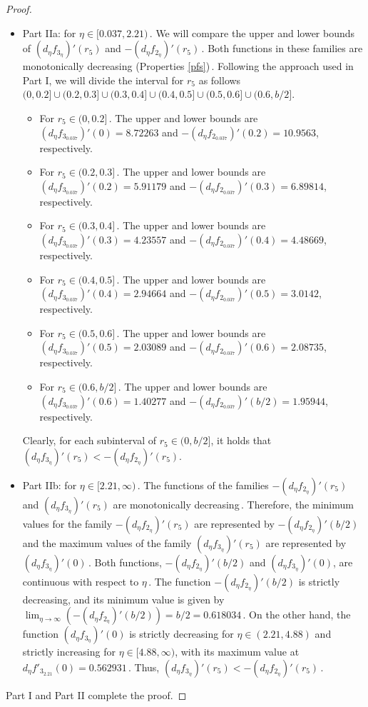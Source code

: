 \documentclass[final,11pt]{article}
\numberwithin{equation}{section}
\theoremstyle{definition}
\begin{document}
\begin{proof}
\begin{itemize}
\item Part IIa: for $\eta\in[0.037,2.21)$\,. We will compare the upper and lower bounds of $(d_{\eta}f_{3_{\eta}})'(r_{5})$ and $-(d_{\eta}f_{2_{\eta}})'(r_{5})$\,. Both functions in these families are monotonically decreasing (Properties \ref{pfs})\,. Following the approach used in Part I, we will divide the interval for $r_{5}$ as follows $(0,0.2]\cup(0.2,0.3]\cup(0.3,0.4]\cup(0.4,0.5]\cup(0.5,0.6]\cup(0.6,b/2]$.
\begin{itemize}
\item For $r_{5}\in (0,0.2]$\,. The upper and lower bounds are  $(d_{\eta}f_{3_{0.037}})'(0)=8.72263$ and $-(d_{\eta}f_{2_{0.037}})'(0.2)=10.9563$, respectively.
\item For $r_{5}\in (0.2,0.3]$\,. The upper and lower bounds are  $(d_{\eta}f_{3_{0.037}})'(0.2)=5.91179$ and $-(d_{\eta}f_{2_{0.037}})'(0.3)=6.89814$, respectively. 
\item For $r_{5}\in (0.3,0.4]$\,. The upper and lower bounds are  $(d_{\eta}f_{3_{0.037}})'(0.3)=4.23557$ and $-(d_{\eta}f_{2_{0.037}})'(0.4)=4.48669$, respectively. 
\item For $r_{5}\in (0.4,0.5]$\,. The upper and lower bounds are  $(d_{\eta}f_{3_{0.037}})'(0.4)=2.94664$ and $-(d_{\eta}f_{2_{0.037}})'(0.5)=3.0142$, respectively. 
\item For $r_{5}\in (0.5,0.6]$\,. The upper and lower bounds are  $(d_{\eta}f_{3_{0.037}})'(0.5)=2.03089$ and $-(d_{\eta}f_{2_{0.037}})'(0.6)=2.08735$, respectively. 
\item For $r_{5}\in (0.6,b/2]$\,. The upper and lower bounds are  $(d_{\eta}f_{3_{0.037}})'(0.6)=1.40277$ and $-(d_{\eta}f_{2_{0.037}})'(b/2)=1.95944$, respectively. 
\end{itemize}

Clearly, for each subinterval of $r_{5}\in(0,b/2]$, it holds that $(d_{\eta}f_{3_{\eta}})'(r_{5})<-(d_{\eta}f_{2_{\eta}})'(r_{5})$.

\item Part IIb: for $\eta\in[2.21,\infty)$\,.  The functions of the families $-(d_{\eta}f_{2_{\eta}})'(r_{5})$ and $(d_{\eta}f_{3_{\eta}})'(r_{5})$ are monotonically decreasing\,. Therefore, the minimum values for the family $-(d_{\eta}f_{2_{\eta}})'(r_{5})$ are represented by $-(d_{\eta}f_{2_{\eta}})'(b/2)$ and the maximum values of the family $(d_{\eta}f_{3_{\eta}})'(r_{5})$ are represented by $(d_{\eta}f_{3_{\eta}})'(0)$\,. Both functions, $-(d_{\eta}f_{2_{\eta}})'(b/2)$ and  $(d_{\eta}f_{3_{\eta}})'(0)$, are continuous with respect to $\eta$\,. The function $-(d_{\eta}f_{2_{\eta}})'(b/2)$ is strictly decreasing, and its minimum value is given by  $\displaystyle{\lim_{\eta\rightarrow \infty}}(-(d_{\eta}f_{2_{\eta}})'(b/2))=b/2=0.618034$\,. On the other hand, the function $(d_{\eta}f_{3_{\eta}})'(0)$ is strictly decreasing for $\eta\in(2.21,4.88)$ and strictly increasing for $\eta\in[4.88,\infty)$,  with its maximum value at  $d_{\eta}f'_{3_{2.21}}(0)=0.562931$\,. Thus, $(d_{\eta}f_{3_{\eta}})'(r_{5})<-(d_{\eta}f_{2_{\eta}})'(r_{5})$\,. \end{itemize}
Part I and Part II complete the proof.
\end{proof}
\end{document}
